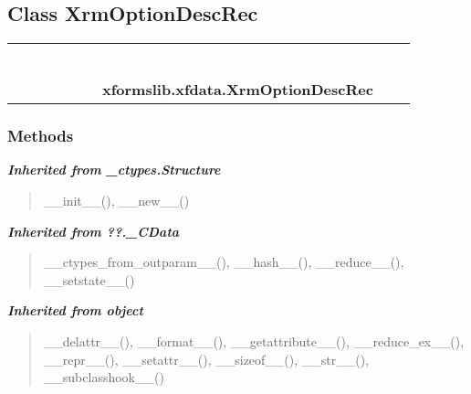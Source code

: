 \subsection{Class XrmOptionDescRec}

    \label{xformslib:xfdata:XrmOptionDescRec}
\begin{tabular}{cccccccccc}
\multicolumn{2}{r}{\settowidth{\BCL}{object}\multirow{2}{\BCL}{object}}
&&
&&
&&
  \\\cline{3-3}
  &&\multicolumn{1}{c|}{}
&&
&&
&&
  \\
\multicolumn{4}{r}{\settowidth{\BCL}{??.\_CData}\multirow{2}{\BCL}{??.\_CData}}
&&
&&
  \\\cline{5-5}
  &&&&\multicolumn{1}{c|}{}
&&
&&
  \\
\multicolumn{6}{r}{\settowidth{\BCL}{\_ctypes.Structure}\multirow{2}{\BCL}{\_ctypes.Structure}}
&&
  \\\cline{7-7}
  &&&&&&\multicolumn{1}{c|}{}
&&
  \\
&&&&&&\multicolumn{2}{l}{\textbf{xformslib.xfdata.XrmOptionDescRec}}
\end{tabular}



  \subsubsection{Methods}


\large{\textbf{\textit{Inherited from \_ctypes.Structure}}}

\begin{quote}
\_\_init\_\_(), \_\_new\_\_()
\end{quote}

\large{\textbf{\textit{Inherited from ??.\_CData}}}

\begin{quote}
\_\_ctypes\_from\_outparam\_\_(), \_\_hash\_\_(), \_\_reduce\_\_(), \_\_setstate\_\_()
\end{quote}

\large{\textbf{\textit{Inherited from object}}}

\begin{quote}
\_\_delattr\_\_(), \_\_format\_\_(), \_\_getattribute\_\_(), \_\_reduce\_ex\_\_(), \_\_repr\_\_(), \_\_setattr\_\_(), \_\_sizeof\_\_(), \_\_str\_\_(), \_\_subclasshook\_\_()
\end{quote}

